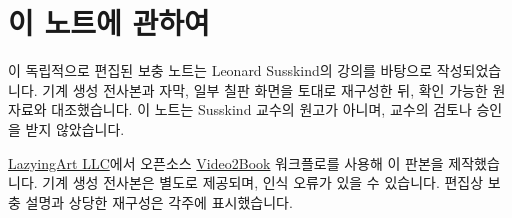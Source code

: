 \documentclass[11pt,oneside]{book}
\begin{document}
\frontmatter
\hypersetup{pageanchor=false}

\hypersetup{pageanchor=true}

\clearpage
\chapter*{이 노트에 관하여}
이 독립적으로 편집된 보충 노트는 Leonard Susskind의 강의를 바탕으로 작성되었습니다. 기계 생성 전사본과 자막, 일부 칠판 화면을 토대로 재구성한 뒤, 확인 가능한 원자료와 대조했습니다. 이 노트는 Susskind 교수의 원고가 아니며, 교수의 검토나 승인을 받지 않았습니다.

\href{https://lazying.art}{LazyingArt LLC}에서 오픈소스 \href{https://github.com/lachlanchen/Video2Book}{Video2Book} 워크플로를 사용해 이 판본을 제작했습니다. 기계 생성 전사본은 별도로 제공되며, 인식 오류가 있을 수 있습니다. 편집상 보충 설명과 상당한 재구성은 각주에 표시했습니다.
\clearpage
\tableofcontents
\mainmatter










\end{document}
